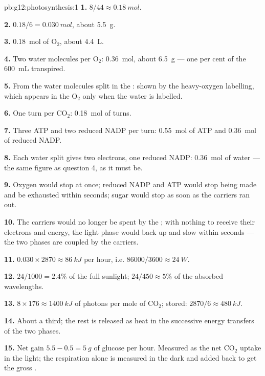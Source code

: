 \begin{solution}{pb:g12:photosynthesis:1}
\textbf{1.} $8/44 \approx \qty{0.18}{mol}$.

\textbf{2.} $0.18/6 = \qty{0.030}{mol}$, about \qty{5.5}{g}.

\textbf{3.} \qty{0.18}{mol} of $\mathrm{O_2}$, about \qty{4.4}{L}.

\textbf{4.} Two water molecules per $\mathrm{O_2}$: \qty{0.36}{mol},
about \qty{6.5}{g} --- one per cent of the \qty{600}{mL} transpired.

\textbf{5.} From the water molecules split in the : shown by
the heavy-oxygen labelling, which appears in the $\mathrm{O_2}$ only
when the water is labelled.

\textbf{6.} One turn per $\mathrm{CO_2}$: \qty{0.18}{mol} of turns.

\textbf{7.} Three ATP and two reduced NADP per turn: \qty{0.55}{mol}
of ATP and \qty{0.36}{mol} of reduced NADP.

\textbf{8.} Each water split gives two electrons, one reduced NADP:
\qty{0.36}{mol} of water --- the same figure as question 4, as it must
be.

\textbf{9.} Oxygen would stop at once; reduced NADP and ATP would stop
being made and be exhausted within seconds; sugar would stop as soon
as the carriers ran out.

\textbf{10.} The carriers would no longer be spent by the ; with nothing to receive their electrons and energy, the light
phase would back up and slow within seconds --- the two phases are
coupled by the carriers.

\textbf{11.} $0.030 \times 2870 \approx \qty{86}{kJ}$ per hour, i.e.
$86000/3600 \approx \qty{24}{W}$.

\textbf{12.} $24/1000 = 2.4\%$ of the full sunlight; $24/450 \approx
5\%$ of the absorbed wavelengths.

\textbf{13.} $8 \times 176 \approx \qty{1400}{kJ}$ of photons per mole
of $\mathrm{CO_2}$; stored: $2870/6 \approx \qty{480}{kJ}$.

\textbf{14.} About a third; the rest is released as heat in the
successive energy transfers of the two phases.

\textbf{15.} Net gain $5.5 - 0.5 = \qty{5}{g}$ of glucose per hour.
Measured as the net $\mathrm{CO_2}$ uptake in the light; the
respiration alone is measured in the dark and added back to get the
gross .


\end{solution}
